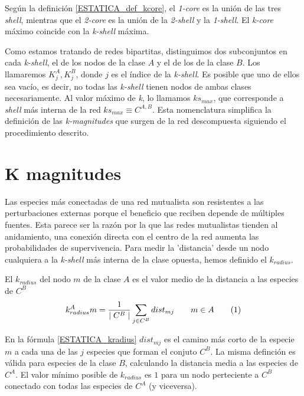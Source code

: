 Según la definición \ref{ESTATICA_def_kcore}, el  \textit{1-core} es la unión de las tres \textit{shell}, mientras que el \textit{2-core} es la unión de la \textit{2-shell} y la \textit{1-shell}. El \textit{k-core} máximo coincide con la  \textit{k-shell} máxima. 

Como estamos tratando de redes bipartitas, distinguimos dos subconjuntos en cada \textit{k-shell}, el de los nodos de la clase $A$ y el de los de la clase $B$. Los llamaremos $K^{A}_{j}, K^{B}_{j}$, donde  $j$ es el índice de la \textit{k-shell}.
Es posible que uno de ellos sea vacío, es decir, no todas las \textit{k-shell} tienen nodos de ambas clases necesariamente.
Al valor máximo de \textit{k}, lo llamamos $ks_{max}$, que corresponde a \textit{shell} más interna de la red $ks_{max}\equiv C^{A,B}$. Esta nomenclatura simplifica la definición de las \textit{k-magnitudes} que surgen de la red descompuesta siguiendo el procedimiento descrito.


\section{K magnitudes}

Las especies más conectadas de una red mutualista son resistentes a las perturbaciones externas porque el beneficio que reciben depende de múltiples fuentes. Esta parece ser la razón por la que las redes mutualistas tienden al anidamiento, una conexión directa con el centro de la red aumenta las probabilidades de supervivencia. Para medir la 'distancia' desde un nodo cualquiera a la \textit{k-shell} más interna de la clase opuesta, hemos definido el \textit{$k_{radius}$}.

\begin{theo} 
El \textit{$k_{radius}$} del nodo $m$ de la clase $A$ es el valor medio de la distancia a las especies de $C^B$
\begin{align*}
\displaystyle
k^A_{radius}m = \frac{1}{\mid C^{B} \mid}\sum\limits_{j \in C^{B}} dist_{mj}  \qquad   m \in A
\stepcounter{equation}\tag{\theequation}\label{kradius}
\end{align*}
\label{ESTATICA_kradius}
\end{theo}

En la fórmula \ref{ESTATICA_kradius} $dist_{mj}$ es el camino más corto de la especie $m$ a cada una de las $j$ especies que forman el conjuto $C^B$. La misma definción es válida para especies de la clase $B$, calculando la distancia media a las especies de $C^A$. El valor mínimo posible de $k_{radius}$ es $1$ para un nodo perteciente a $C^B$ conectado con todas las especies de $C^A$ (y viceversa).

